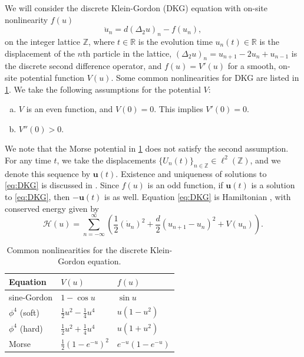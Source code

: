 \documentclass[12pt,reqno]{amsart}
\def\R{{\mathbb R}}
\def\Z{{\mathbb Z}}
\newcommand{\uvec}{\mathbf{u}}
\begin{document}
We will consider the discrete Klein-Gordon (DKG) equation with on-site nonlinearity $f(u)$
\begin{equation}\label{eq:DKG}
\ddot{u}_n = d (\Delta_2 u)_n - f(u_n),
\end{equation}
on the integer lattice $\Z$, where $t \in \R$ is the evolution time $u_n(t) \in \R$ is the displacement of the $n$th particle in the lattice, $(\Delta_2 u)_n = u_{n+1} - 2 u_n + u_{n-1}$ is the discrete second difference operator, and $f(u) = V'(u)$ for a smooth, on-site potential function $V(u)$. Some common nonlinearities for DKG are listed in \cref{table:V}. We take the following assumptions for the potential $V$:
\begin{enumerate}[(a)]
\item $V$ is an even function, and $V(0) = 0$. This implies $V'(0) = 0$.
\item $V''(0)>0$.
\end{enumerate}
We note that the Morse potential in \cref{table:V} does not satisfy the second assumption. For any time $t$, we take the displacements $\{U_n(t)\}_{n \in \Z} \in \ell^2(\Z)$, and we denote this sequence by $\uvec(t)$. Existence and uniqueness of solutions to \cref{eq:DKG} is discussed in \cite{cuevas-maraver2016}. Since $f(u)$ is an odd function, if $\uvec(t)$ is a solution to \cref{eq:DKG}, then $-\uvec(t)$ is as well. Equation \cref{eq:DKG} is Hamiltonian \cites{KevrekidisWeinstein2000,cuevas-maraver2016}, with conserved energy given by
\begin{equation}\label{eq:H}
	\mathcal{H}(u) = \sum_{n=-\infty}^\infty 
	\left( \frac{1}{2} (\dot{u}_n)^2 + \frac{d}{2} (u_{n+1} - u_n)^2 + V(u_n) \right).
\end{equation}

\begin{table}
\begin{tabular}{lll}\toprule
Equation & $V(u)$ & $f(u)$ \\ \midrule
sine-Gordon & $1 - \cos u$ & $\sin u$ \\
$\phi^4$ (soft) & $\frac{1}{2}u^2 - \frac{1}{4}u^4$ & $u(1-u^2)$ \\
$\phi^4$ (hard) & $\frac{1}{2}u^2 + \frac{1}{4}u^4$ & $u(1+u^2)$ \\
Morse & $\frac{1}{2}(1 - e^{-u})^2$ & $e^{-u}(1 - e^{-u})$ \\ \bottomrule
\end{tabular}
\caption{Common nonlinearities for the discrete Klein-Gordon equation.}
\label{table:V}
\end{table}
\end{document}
